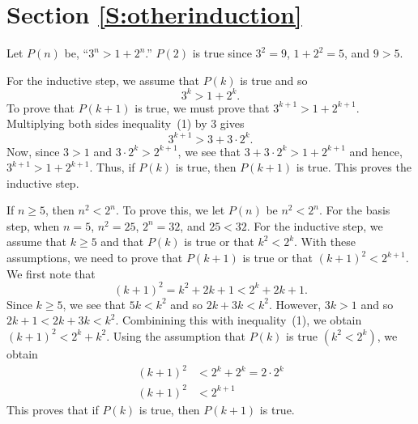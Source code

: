 \section*{Section \ref{S:otherinduction}}
\renewcommand{\labelenumi}{(\textbf{\alph{enumi}})}

\begin{list}{\bf{\ref{exer:sec52-1}.}}
\item \begin{list}{\bf{(a)}}
\item Let $P \left( n \right)$ be, ``$3^n > 1 + 2^n$.''  $P \left( 2 \right)$ is true since $3^2 = 9$, $1 + 2^2 = 5$, and $9 > 5$.

For the inductive step, we assume that $P \left( k \right)$ is true and so 
\begin{equation}
3^k > 1 + 2^k.
\end{equation}
To prove that $P(k+1)$ is true, we must prove that $3^{k+1} > 1 + 2^{k+1}$.  Multiplying both sides inequality~(1) by 3 gives
\[
3^{k + 1} > 3 + 3 \cdot 2^k.
\]
Now, since $3 > 1$ and $3 \cdot 2^k > 2^{k + 1}$, we see that $3 + 3 \cdot 2^k > 1 + 2^{k+1}$ and hence, $3^{k + 1} > 1 + 2^{k+1}$.  Thus, if $P \left( k \right)$ is true, then $P \left( k +1  \right)$ is true.  This proves the inductive step.
\end{list}
\end{list}

\setcounter{equation}{0}
\begin{list}{\bf{\ref{exer:sec52-6}.}} 
\item If $n \geq 5$, then $n^2 < 2^n$.  To prove this, we let $P(n)$ be $n^2 < 2^n$.  For the basis step, when $n = 5$, $n^2 = 25$, $2^n = 32$, and $25 < 32$.  For the inductive step, we assume that $k \geq 5$  and that $P(k)$ is true or that $k^2 < 2^k$.  With these assumptions, we need to prove that $P(k+1)$ is true or that $(k+1)^2 < 2^{k+1}$.  We first note that 
\begin{equation}
( k + 1 )^2 = k^2 + 2k + 1 < 2^k + 2k + 1.
\end{equation}
Since $k \geq 5$, we see that $5k < k^2$ and so $2k + 3k < k^2$.  However, $3k > 1$ and so $2k + 1 < 2k + 3k < k^2$.  Combinining this with inequality~(1), we obtain $(k+1)^2 < 2^k+ k^2$.  Using the assumption that $P(k)$ is true $\left(k^2 < 2^k\right)$, we obtain
\begin{align*}
(k+1)^2 &< 2^k + 2^k = 2 \cdot 2^k \\
(k+1)^2 &< 2^{k+1}
\end{align*}
This proves that if $P(k)$ is true, then $P(k+1)$ is true.
\end{list}



